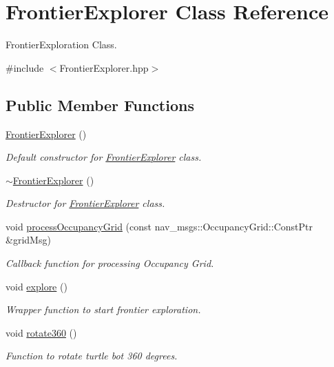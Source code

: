 \hypertarget{classFrontierExplorer}{}\section{Frontier\+Explorer Class Reference}
\label{classFrontierExplorer}


Frontier\+Exploration Class.  




{\ttfamily \#include $<$Frontier\+Explorer.\+hpp$>$}

\subsection*{Public Member Functions}
\begin{DoxyCompactItemize}
\item 
\hyperlink{classFrontierExplorer_aeb9f6b222b5e31b8c41f41e04fece7b0}{Frontier\+Explorer} ()
\begin{DoxyCompactList}\small\item\em Default constructor for \hyperlink{classFrontierExplorer}{Frontier\+Explorer} class. \end{DoxyCompactList}\item 
\hyperlink{classFrontierExplorer_a4f855409482b23bb537505f5543c3e0d}{$\sim$\+Frontier\+Explorer} ()
\begin{DoxyCompactList}\small\item\em Destructor for \hyperlink{classFrontierExplorer}{Frontier\+Explorer} class. \end{DoxyCompactList}\item 
void \hyperlink{classFrontierExplorer_aacc7b104656ec07f8901abeae2d1b2c3}{process\+Occupancy\+Grid} (const nav\+\_\+msgs\+::\+Occupancy\+Grid\+::\+Const\+Ptr \&grid\+Msg)
\begin{DoxyCompactList}\small\item\em Callback function for processing Occupancy Grid. \end{DoxyCompactList}\item 
void \hyperlink{classFrontierExplorer_acdb01ab0862ad3d22b5c13e13edae821}{explore} ()
\begin{DoxyCompactList}\small\item\em Wrapper function to start frontier exploration. \end{DoxyCompactList}\item 
void \hyperlink{classFrontierExplorer_acdea468a554a1665ada8a9d47fdb12ad}{rotate360} ()
\begin{DoxyCompactList}\small\item\em Function to rotate turtle bot 360 degrees. \end{DoxyCompactList}\item 

\end{DoxyCompactItemize}
